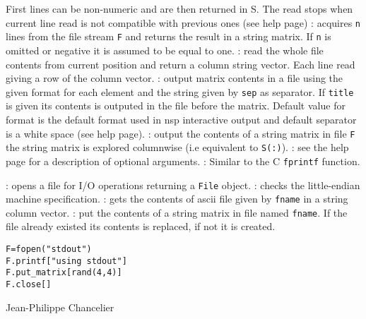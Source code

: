 \begin{itemize}
  First lines can be non-numeric and are then returned in S. The read stops when current 
  line read is not compatible with previous ones (see   help page)
  : acquires \verb+n+ lines from the file stream \verb+F+ and returns 
  the result in a string matrix. If \verb+n+ is omitted or negative it is assumed to be equal to 
  one. 
  : read the whole file contents from current position
  and return a column string vector. Each line read giving a row of the column vector.
  : 
    output  matrix contents in a file using the given format for each element 
    and the string given by \verb+sep+ as separator. If \verb+title+ is given 
    its contents is outputed in the file before the matrix. Default value 
    for format is the default format used in nsp interactive output and default 
    separator is a white space (see   help page).  
  : output the contents of a string matrix in file \verb+F+ 
  the string matrix is explored columnwise (i.e equivalent to \verb+S(:)+).
  : 
  see the  help page for a description of optional arguments.
  : Similar to the C \verb+fprintf+ function. 
\end{itemize}

\begin{itemize}
  : opens a file for I/O operations returning a \verb+File+ object.
  : checks the little-endian machine specification.
  : gets the contents of ascii file given by \verb+fname+ 
  in a string column vector.
  : put the contents of a string matrix in file named 
  \verb+fname+. If the file already existed its contents is replaced, if not it is 
  created. 
\end{itemize}

\begin{examples}
\begin{Verbatim}
F=fopen("stdout")
F.printf["using stdout"]
F.put_matrix[rand(4,4)]
F.close[]
\end{Verbatim}
\end{examples}

\begin{manseealso}
\end{manseealso}

\begin{authors}
  Jean-Philippe Chancelier 
\end{authors}

